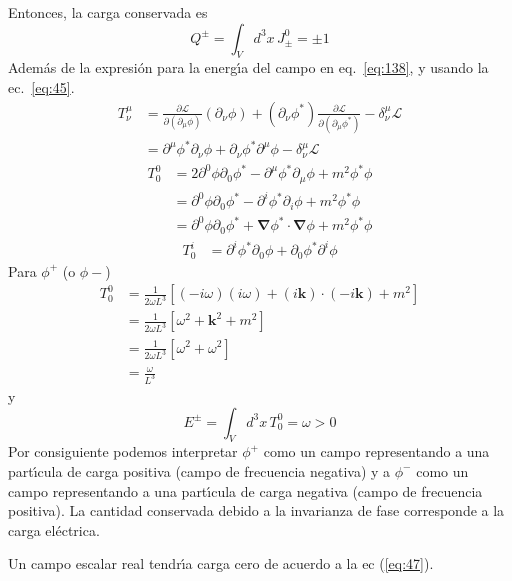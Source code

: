 Entonces, la carga conservada es
\begin{equation}
  Q^{\pm}=\int_Vd^3x\,J^0_{\pm}=\pm1
\end{equation}
Adem\'as de la expresi\'on para la energ\'\i a del campo en eq.~\eqref{eq:138}, y usando la ec.~\eqref{eq:45}.
\begin{align}
    T^\mu_\nu&=\frac{\partial\mathcal{L}}{\partial(\partial_\mu\phi)}(\partial_\nu\phi)+(\partial_\nu\phi^*)\frac{\partial\mathcal{L}}{\partial(\partial_\mu\phi^*)}
      -\delta^\mu_\nu\mathcal{L}  \nonumber\\
      &=\partial^\mu\phi^*\partial_\nu\phi+\partial_\nu\phi^*\partial^\mu\phi-\delta^\mu_\nu\mathcal{L}
\end{align}
\begin{align}
  T^0_0&=2\partial^0\phi\partial_0\phi^*-\partial^\mu\phi^*\partial_\mu\phi+m^2\phi^*\phi\nonumber\\
  &=\partial^0\phi\partial_0\phi^*-\partial^i\phi^*\partial_i\phi+m^2\phi^*\phi\nonumber\\
  &=\partial^0\phi\partial_0\phi^*+\boldsymbol{\nabla}\phi^*\cdot\boldsymbol{\nabla}\phi+m^2\phi^*\phi
\end{align}
\begin{align}
  T^i_0&=\partial^i\phi^*\partial_0\phi+\partial_0\phi^*\partial^i\phi
\end{align}
Para $\phi^+$ (o $\phi-$)
\begin{align}
  T^0_0&=\frac{1}{2\omega L^3}\left[(-i\omega)(i\omega)+(i\mathbf{k})\cdot(-i\mathbf{k})+m^2\right]\nonumber\\
 & =\frac{1}{2\omega L^3}\left[\omega^2+\mathbf{k}^2+m^2\right]\nonumber\\
& =\frac{1}{2\omega L^3}\left[\omega^2+\omega^2\right]\nonumber\\
& =\frac{\omega}{L^3}
\end{align}
y
\begin{equation}
  E^\pm=\int_Vd^3x\,T^0_0=\omega\gt 0
\end{equation}
Por consiguiente podemos interpretar $\phi^+$ como un campo representando
a una part\'\i cula de carga positiva (campo de frecuencia negativa) y a
$\phi^-$ como un campo representando a una part\'\i cula de carga negativa
(campo de frecuencia positiva). La cantidad conservada debido a la
invarianza de fase corresponde a la carga el\'ectrica. 

Un campo escalar real tendr\'\i a carga cero de acuerdo a la
ec (\ref{eq:47}).

